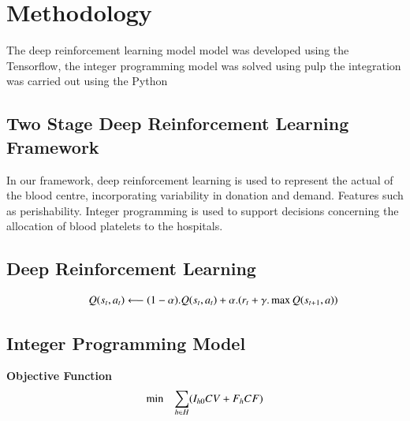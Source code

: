 \documentclass{elsarticle}
\begin{document}
		
		
		

\section{Methodology}

		The deep reinforcement learning model model was developed using the Tensorflow, the integer programming model was solved using pulp the integration was carried out using the Python
		
		\cite{Feynman1963118}
		\cite{Dirac1953888}
		
	\subsection{Two Stage Deep Reinforcement Learning Framework}
	
	In our framework, deep reinforcement learning is used to represent the actual of the blood centre, incorporating variability in donation and demand. Features such as perishability. Integer programming is used to support decisions concerning the allocation of blood platelets to the hospitals.


\subsection{Deep Reinforcement Learning}


\begin{equation}
	\begin{array}{ll@{}ll}
	& \displaystyle Q(s_{t},a_{t}) \longleftarrow  (1 - \alpha ).Q(s_{t},a_{t}) + \alpha .(r_{t} + \gamma . \max Q(s_{t+1},a))\\
	\end{array}
	\label{eq:Eq32}
	\end{equation}	
		



\subsection{Integer Programming Model}

		
	\textbf{Objective Function}
	\begin{equation}
	\begin{array}{ll@{}ll}
	\min  & \displaystyle\sum\limits_{h \in H}&(I_{h0}CV + F_{h}CF)\\
	\end{array}
	\label{eq:Eq31}
	\end{equation}
\end{document}
